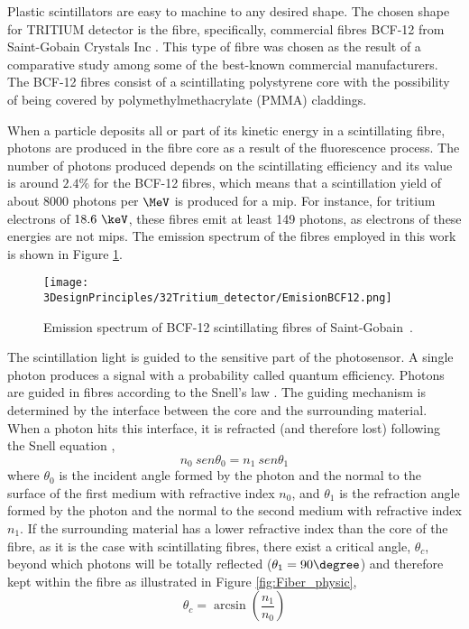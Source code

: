 Plastic scintillators are easy to machine to any desired shape. The chosen shape for TRITIUM detector is the fibre, specifically, commercial fibres BCF-12 from Saint-Gobain Crystals Inc \cite{DataSheetBCF12Fiber}. This type of fibre was chosen as the result of a comparative study \cite{TFGAlberto} among some of the best-known commercial manufacturers. The BCF-12 fibres consist of a scintillating polystyrene core with the possibility of being covered by polymethylmethacrylate (PMMA) claddings. %

When a particle deposits all or part of its kinetic energy in a scintillating fibre, photons are produced in the fibre core as a result of the fluorescence process. The number of photons produced depends on the scintillating efficiency and its value is around $2.4\%$ for the BCF-12 fibres, which means that a scintillation yield of about $8000$ photons per $\MeV$ is produced for a mip. For instance, for tritium electrons of $18.6~\keV$, these fibres emit at least 149 photons, as electrons of these energies are not mips. The emission spectrum of the fibres employed in this work is shown in Figure \ref{fig:EmissionSpectrumFibers}.

\begin{figure}[htbp]
\centering
\texttt{[image: 3DesignPrinciples/32Tritium\_detector/EmisionBCF12.png]}
\caption{Emission spectrum of BCF-12 scintillating fibres of Saint-Gobain\label{fig:EmissionSpectrumFibers}~\cite{DataSheetBCF12Fiber}.}
\end{figure}

The scintillation light is guided to the sensitive part of the photosensor. A single photon produces a signal with a probability called quantum efficiency. Photons are guided in fibres according to the Snell's law \cite{Snell}. The guiding mechanism is determined by the interface between the core and the surrounding material. When a photon hits this interface, it is refracted (and therefore lost) following the Snell equation \cite{Snell}, 
\begin{equation}
n_0~sen\theta_0 = n_1~sen\theta_1
\label{eq:Snell}
\end{equation}
where $\theta_0$ is the incident angle formed by the photon and the normal to the surface of the first medium with refractive index $n_0$, and $\theta_1$  is the refraction angle formed by the photon and the normal to the second medium with refractive index $n_1$. If the surrounding material has a lower refractive index than the core of the fibre, as it is the case with scintillating fibres, there exist a critical angle, $\theta_c$, beyond which photons will be totally reflected ($\theta_1 = 90\degree$) and therefore kept within the fibre as illustrated in Figure \ref{fig:Fiber_physic},
\begin{equation}
\theta_c = \arcsin\left(\frac{n_1}{n_0} \right)
\label{eq:CriticAngle}
\end{equation}

